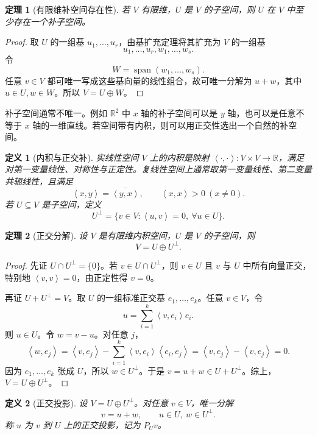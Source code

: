 \documentclass[UTF8,openany,zihao=-4]{ctexbook}
\theoremstyle{cnplain}
\newtheorem{definition}{定义}[chapter]
\newtheorem{theorem}{定理}[chapter]
\newcommand{\R}{\mathbb R}
\newcommand{\Span}{\operatorname{span}}
\newcommand{\inner}[2]{\left\langle #1,#2\right\rangle}
\begin{document}
\begin{theorem}[有限维补空间存在性]
若 $V$ 有限维，$U$ 是 $V$ 的子空间，则 $U$ 在 $V$ 中至少存在一个补子空间。
\end{theorem}

\begin{proof}
取 $U$ 的一组基 $u_1,
\ldots,u_r$，由基扩充定理将其扩充为 $V$ 的一组基
\[
u_1,
\ldots,u_r,w_1,
\ldots,w_s.
\]
令
\[
W=\Span(w_1,
\ldots,w_s).
\]
任意 $v\in V$ 都可唯一写成这些基向量的线性组合，故可唯一分解为 $u+w$，其中 $u\in U,w\in W$。所以 $V=U\oplus W$。
\end{proof}

补子空间通常不唯一。例如 $\R^2$ 中 $x$ 轴的补子空间可以是 $y$ 轴，也可以是任意不等于 $x$ 轴的一维直线。若空间带有内积，则可以用正交性选出一个自然的补空间。

\begin{definition}[内积与正交补]
实线性空间 $V$ 上的内积是映射 $\inner{\cdot}{\cdot}:V\times V\to\R$，满足对第一变量线性、对称性与正定性。复线性空间上通常取第一变量线性、第二变量共轭线性，且满足
\[
\inner{x}{y}=\overline{\inner{y}{x}},
\qquad \inner{x}{x}>0\ (x\ne0).
\]
若 $U\subseteq V$ 是子空间，定义
\[
U^\perp=\{v\in V:\inner{u}{v}=0,
\ \forall u\in U\}.
\]
\end{definition}

\begin{theorem}[正交分解]
设 $V$ 是有限维内积空间，$U$ 是 $V$ 的子空间，则
\[
V=U\oplus U^\perp.
\]
\end{theorem}

\begin{proof}
先证 $U\cap U^\perp=\{0\}$。若 $v\in U\cap U^\perp$，则 $v\in U$ 且 $v$ 与 $U$ 中所有向量正交，特别地 $\inner{v}{v}=0$，由正定性得 $v=0$。

再证 $U+U^\perp=V$。取 $U$ 的一组标准正交基 $e_1,
\ldots,e_k$。任意 $v\in V$，令
\[
u=\sum_{i=1}^k\inner{v}{e_i}e_i.
\]
则 $u\in U$。令 $w=v-u$。对任意 $j$，
\[
\inner{w}{e_j}
=\inner{v}{e_j}-\sum_{i=1}^k\inner{v}{e_i}\inner{e_i}{e_j}
=\inner{v}{e_j}-\inner{v}{e_j}=0.
\]
因为 $e_1,
\ldots,e_k$ 张成 $U$，所以 $w\in U^\perp$。于是 $v=u+w\in U+U^\perp$。综上，$V=U\oplus U^\perp$。
\end{proof}

\begin{definition}[正交投影]
设 $V=U\oplus U^\perp$。对任意 $v\in V$，唯一分解
\[
v=u+w,
\qquad u\in U,
\ w\in U^\perp.
\]
称 $u$ 为 $v$ 到 $U$ 上的正交投影，记为 $P_Uv$。
\end{definition}
\end{document}

